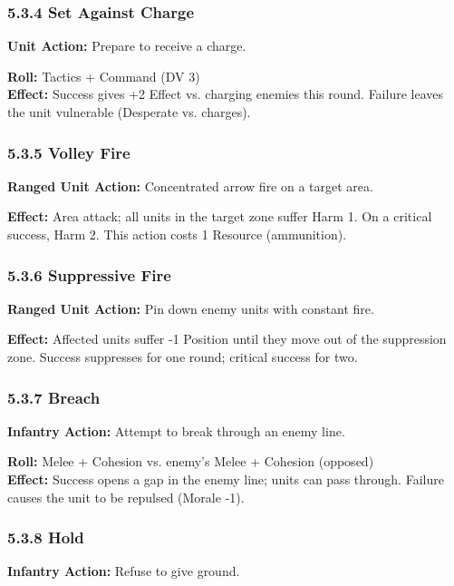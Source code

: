 \documentclass[11pt]{article}
\begin{document}
\subsubsection{5.3.4 Set Against Charge}

\textbf{Unit Action:} Prepare to receive a charge.

\textbf{Roll:} Tactics + Command (DV 3)\\
\textbf{Effect:} Success gives +2 Effect vs. charging enemies this round. Failure leaves the unit vulnerable (Desperate vs. charges).

\subsubsection{5.3.5 Volley Fire}

\textbf{Ranged Unit Action:} Concentrated arrow fire on a target area.

\textbf{Effect:} Area attack; all units in the target zone suffer Harm 1. On a critical success, Harm 2. This action costs 1 Resource (ammunition).

\subsubsection{5.3.6 Suppressive Fire}

\textbf{Ranged Unit Action:} Pin down enemy units with constant fire.

\textbf{Effect:} Affected units suffer -1 Position until they move out of the suppression zone. Success suppresses for one round; critical success for two.

\subsubsection{5.3.7 Breach}

\textbf{Infantry Action:} Attempt to break through an enemy line.

\textbf{Roll:} Melee + Cohesion vs. enemy's Melee + Cohesion (opposed)\\
\textbf{Effect:} Success opens a gap in the enemy line; units can pass through. Failure causes the unit to be repulsed (Morale -1).

\subsubsection{5.3.8 Hold}

\textbf{Infantry Action:} Refuse to give ground.
\end{document}
